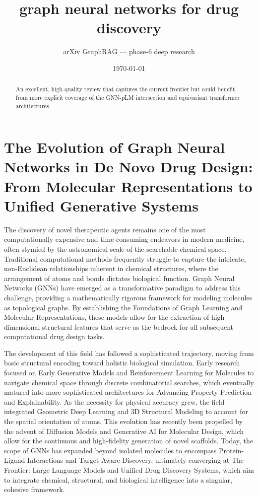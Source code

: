 \documentclass[11pt]{article}
\title{graph neural networks for drug discovery}
\author{arXiv GraphRAG --- phase-6 deep research}
\date{\today}
\begin{document}
\maketitle

\begin{abstract}
An excellent, high-quality review that captures the current frontier but could benefit from more explicit coverage of the GNN-pLM intersection and equivariant transformer architectures.
\end{abstract}

\section{The Evolution of Graph Neural Networks in De Novo Drug Design: From Molecular Representations to Unified Generative Systems}

The discovery of novel therapeutic agents remains one of the most computationally expensive and time-consuming endeavors in modern medicine, often stymied by the astronomical scale of the searchable chemical space. Traditional computational methods frequently struggle to capture the intricate, non-Euclidean relationships inherent in chemical structures, where the arrangement of atoms and bonds dictates biological function. Graph Neural Networks (GNNs) have emerged as a transformative paradigm to address this challenge, providing a mathematically rigorous framework for modeling molecules as topological graphs. By establishing the Foundations of Graph Learning and Molecular Representations, these models allow for the extraction of high-dimensional structural features that serve as the bedrock for all subsequent computational drug design tasks.

The development of this field has followed a sophisticated trajectory, moving from basic structural encoding toward holistic biological simulation. Early research focused on Early Generative Models and Reinforcement Learning for Molecules to navigate chemical space through discrete combinatorial searches, which eventually matured into more sophisticated architectures for Advancing Property Prediction and Explainability. As the necessity for physical accuracy grew, the field integrated Geometric Deep Learning and 3D Structural Modeling to account for the spatial orientation of atoms. This evolution has recently been propelled by the advent of Diffusion Models and Generative AI for Molecular Design, which allow for the continuous and high-fidelity generation of novel scaffolds. Today, the scope of GNNs has expanded beyond isolated molecules to encompass Protein-Ligand Interactions and Target-Aware Discovery, ultimately converging at The Frontier: Large Language Models and Unified Drug Discovery Systems, which aim to integrate chemical, structural, and biological intelligence into a singular, cohesive framework.
\end{document}
